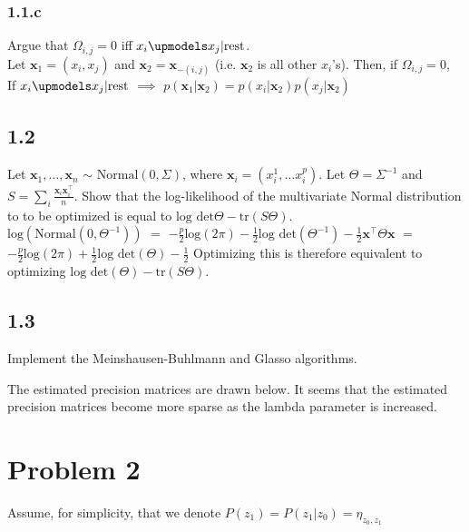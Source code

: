 \documentclass[12pt]{article}
\begin{document}
\subsubsection*{1.1.c}
Argue that $\Omega_{i,j}=0$ iff $x_i \upmodels x_j | \text{rest}$.\\

Let $\textbf{x}_1 = (x_i,x_j)$ and $\textbf{x}_2 = \textbf{x}_{-(i,j)}$ (i.e. $\textbf{x}_2$ is all other $x_i$'s). Then, if $\Omega_{i,j} = 0$, 
\\

If $x_i \upmodels x_j | \text{rest}$ $\implies$ $p(\textbf{x}_1 | \textbf{x}_2) = p(x_i | \textbf{x}_2) p(x_j | \textbf{x}_2)$


\subsection*{1.2}
Let $\textbf{x}_1, \ldots, \textbf{x}_n$ $\sim$ $\text{Normal}(0,\Sigma)$, where $\textbf{x}_i = (x_i^1, \ldots x_i^p)$. Let $\Theta = \Sigma^{-1}$ and $S = \sum_i \frac{\textbf{x}_i \textbf{x}_i^\top}{n}$. Show that the log-likelihood of the multivariate Normal distribution to to be optimized is equal to $\text{log} \text{ det} \Theta - \text{tr}(S\Theta)$.
\\

$\text{log}(\text{Normal}(0,\Theta^{-1}))$ $=$ 
$-\frac{p}{2}\text{log}(2\pi) - \frac{1}{2} \text{log} \text{ det}(\Theta^{-1}) - \frac{1}{2}\textbf{x}^{\top} \Theta \textbf{x}$ 
$=$ 
$-\frac{p}{2}\text{log}(2\pi) + \frac{1}{2} \text{log} \text{ det}(\Theta) - \frac{1}{2}$
Optimizing this is therefore equivalent to optimizing $\text{log} \text{ det}(\Theta) - \text{tr}(S\Theta)$.


\subsection*{1.3}
Implement the Meinshausen-Buhlmann and Glasso algorithms.

The estimated precision matrices are drawn below. It seems that the estimated precision matrices become more sparse as the lambda parameter is increased.



\section*{Problem 2}
\label{sec:prob2}
Assume, for simplicity, that we denote $P(z_1) = P(z_1 | z_0) = \eta_{z_0,z_1}$
\end{document}
